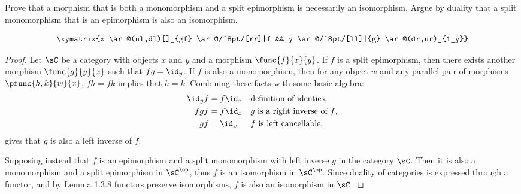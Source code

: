 \documentclass[main.tex]{subfiles}
\begin{document}
\begin{exercise}
	Prove that a morphism that is both a monomorphism and a split epimorphism is
	necessarily an isomorphism. Argue by duality that a split monomorphism that
	is an epimorphism is also an isomorphism.
\end{exercise}
	\[\xymatrix{x \ar@(ul,dl)[]_{gf} \ar@/^8pt/[rr]|f && y \ar@/^8pt/[ll]|{g} \ar@(dr,ur)_{1_y}}\]
\begin{proof}
	Let \(\sC\) be a category with objects \(x\) and \(y\) and a morphism
	\(\func{f}{x}{y}\). If \(f\) is a split epimorphism, then there exists
	another morphism \(\func{g}{y}{x}\) such that \(fg=\id_y\). If \(f\) is also
	a monomorphism, then for any object \(w\) and any parallel pair of morphisms
	\(\pfunc{h,k}{w}{x}\), \(fh=fk\) implies that \(h=k\). Combining these facts
	with some basic algebra:
	\begin{align*}
		\id_yf&=f\id_x && \textrm{definition of identies}, \\
		fgf&=f\id_x && \textrm{\(g\) is a right inverse of \(f\)}, \\
		gf&=\id_x && \textrm{\(f\) is left cancellable},
	\end{align*}
	gives that \(g\) is also a left inverse of \(f\).

	Supposing instead that \(f\) is an epimorphism and a split monomorphism with
	left inverse \(g\) in the category \(\sC\). Then it is also a monomorphism
	and a split epimorphism in \(\sC^\op\), thus \(f\) is an isomorphism in
	\(\sC^\op\). Since duality of categories is expressed through a functor, and
	by Lemma 1.3.8 functors preserve isomorphisms, \(f\) is also an isomorphism
	in \(\sC\).
\end{proof}
\end{document}
